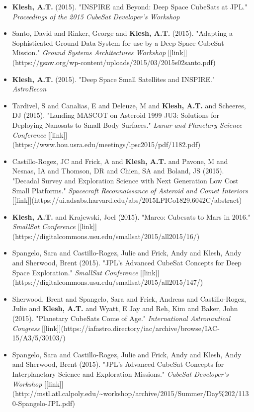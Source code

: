 \documentclass[11pt,letterpaper]{article}
\begin{document}
\begin{itemize}
\item \textbf{Klesh, A.T.} (2015). "INSPIRE and Beyond: Deep Space CubeSats at JPL." \textit{Proceedings of the 2015 CubeSat Developer's Workshop}
\item Santo, David and Rinker, George and \textbf{Klesh, A.T.} (2015). "Adapting a Sophisticated Ground Data System for use by a Deep Space CubeSat Mission." \textit{Ground Systems Architectures Workshop} [[link]](https://gsaw.org/wp-content/uploads/2015/03/2015s02santo.pdf)
\item \textbf{Klesh, A.T.} (2015). "Deep Space Small Satellites and INSPIRE." \textit{AstroRecon}
\item Tardivel, S and Canalias, E and Deleuze, M and \textbf{Klesh, A.T.} and Scheeres, DJ (2015). "Landing MASCOT on Asteroid 1999 JU3: Solutions for Deploying Nanosats to Small-Body Surfaces." \textit{Lunar and Planetary Science Conference} [[link]](https://www.hou.usra.edu/meetings/lpsc2015/pdf/1182.pdf)
\item Castillo-Rogez, JC and Frick, A and \textbf{Klesh, A.T.} and Pavone, M and Nesnas, IA and Thomson, DR and Chien, SA and Boland, JS (2015). "Decadal Survey and Exploration Science with Next Generation Low Cost Small Platforms." \textit{Spacecraft Reconnaissance of Asteroid and Comet Interiors} [[link]](https://ui.adsabs.harvard.edu/abs/2015LPICo1829.6042C/abstract)
\item \textbf{Klesh, A.T.} and Krajewski, Joel (2015). "Marco: Cubesats to Mars in 2016." \textit{SmallSat Conference} [[link]](https://digitalcommons.usu.edu/smallsat/2015/all2015/16/)
\item Spangelo, Sara and Castillo-Rogez, Julie and Frick, Andy and Klesh, Andy and Sherwood, Brent (2015). "JPL's Advanced CubeSat Concepts for Deep Space Exploration." \textit{SmallSat Conference} [[link]](https://digitalcommons.usu.edu/smallsat/2015/all2015/147/)
\item Sherwood, Brent and Spangelo, Sara and Frick, Andreas and Castillo-Rogez, Julie and \textbf{Klesh, A.T.} and Wyatt, E Jay and Reh, Kim and Baker, John (2015). "Planetary CubeSats Come of Age." \textit{International Astronautical Congress} [[link]](https://iafastro.directory/iac/archive/browse/IAC-15/A3/5/30103/)
\item Spangelo, Sara and Castillo-Rogez, Julie and Frick, Andy and Klesh, Andy and Sherwood, Brent (2015). "JPL's Advanced CubeSat Concepts for Interplanetary Science and Exploration Missions." \textit{CubeSat Developer's Workshop} [[link]](http://mstl.atl.calpoly.edu/\textasciitilde{}workshop/archive/2015/Summer/Day\%202/1130-Spangelo-JPL.pdf)

\end{itemize}
\end{document}
